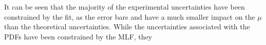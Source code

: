 It can be seen that the majority of the experimental uncertainties have been constrained by the fit, as the error bars  and have a much smaller impact on the $\mu$ than the theoretical uncertainties.
While the uncertainties associated with the PDFs have been constrained by the MLF, they 



%

%

%
%
%
% 
% 
%

